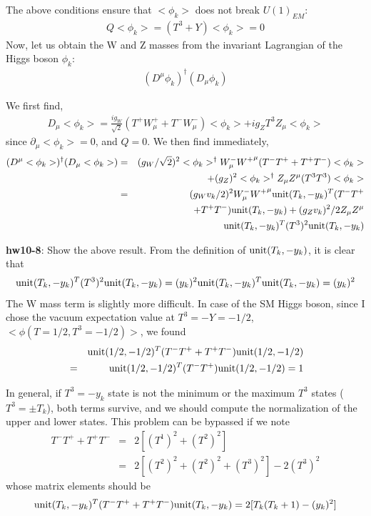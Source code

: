 \documentclass[12pt]{article}
\def\del{{\partial}}
\begin{document}
  The above conditions ensure that $<\phi_k>$ does not break $U(1)_{EM}$:
\begin{eqnarray}
  Q <\phi_k> = (T^3+Y) <\phi_k> = 0
\end{eqnarray}
  Now, let us obtain the W and Z masses from the invariant Lagrangian
  of the Higgs boson $\phi_k$:
\begin{eqnarray}
  (D^\mu \phi_k)^\dagger (D_\mu \phi_k)
\end{eqnarray}
 
  We first find,
\begin{eqnarray}
  D_\mu <\phi_k>
  = \frac{ig_W}{\sqrt2} (T^+ W^+_\mu + T^- W^-_\mu) <\phi_k>
  + ig_Z       T^3 Z_\mu<\phi_k>
\end{eqnarray}
  since $\del_\mu <\phi_k> = 0$, and $Q=0$.  We then find immediately,
\begin{eqnarray}
  (D^\mu <\phi_k>)^\dagger (D_\mu <\phi_k>)
  &=& (g_W/\sqrt2)^2 <\phi_k>^\dagger W^-_\mu {W^+}^\mu
                              ( T^- T^+ + T^+ T^- ) <\phi_k> \nonumber \\
  &&+ (g_Z)^2 <\phi_k>^\dagger Z_\mu Z^\mu (T^3 T^3)  <\phi_k> \\
  &=& (g_W v_k/2)^2 W^-_\mu {W^+}^\mu
    {\rm unit}(T_k,-y_k)^T ( T^- T^+ \nonumber \\ &&+ T^+ T^- ) {\rm unit}(T_k,-y_k) + (g_Z v_k)^2/2 Z_\mu Z^\mu \nonumber \\
    && {\rm unit}(T_k,-y_k)^T (T^3)^2 {\rm unit}(T_k,-y_k)
\end{eqnarray}
  
{\bf hw10-8}:  Show the above result.
  From the definition of ${\rm unit}(T_k,-y_k)$, it is clear that
\begin{eqnarray}
  {\rm unit}(T_k,-y_k)^T (T^3)^2 {\rm unit}(T_k,-y_k)
  = (y_k)^2  {\rm unit}(T_k,-y_k)^T {\rm unit}(T_k,-y_k)
  = (y_k)^2
\end{eqnarray}
  The W mass term is slightly more difficult.  In case of the SM Higgs
  boson, since I chose the vacuum expectation value at $T^3=-Y=-1/2$,
  $<\phi(T=1/2,T^3=-1/2)>$, we found
\begin{eqnarray}
  &&{\rm unit}(1/2,-1/2)^T ( T^- T^+ + T^+ T^- ) {\rm unit}(1/2,-1/2) \nonumber\\
  &=& {\rm unit}(1/2,-1/2)^T ( T^- T^+ ){\rm unit}(1/2,-1/2)  
  = 1
\end{eqnarray}
 

  In general, if $T^3=-y_k$ state is not the minimum or the maximum $T^3$
  states ($T^3=\pm T_k$), both terms survive, and we should compute the
  normalization of the upper and lower states.  This problem can be
  bypassed if we note
\begin{eqnarray}
  T^- T^+ + T^+ T^-
  &=& 2 [(T^1)^2 + (T^2)^2 ] \\
  &=& 2 [(T^2)^2 + (T^2)^2 + (T^3)^2] - 2(T^3)^2
\end{eqnarray}
  whose matrix elements should be
\begin{eqnarray}
  {\rm unit}(T_k,-y_k)^T ( T^- T^+ + T^+ T^- ) {\rm unit}(T_k,-y_k)
  = 2 [ T_k(T_k+1) - (y_k)^2 ]
\end{eqnarray}
 
\end{document}
